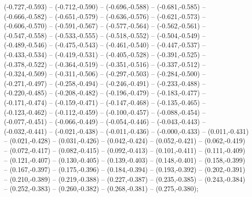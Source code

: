 (-0.727,-0.593) -- (-0.712,-0.590) -- (-0.696,-0.588) -- (-0.681,-0.585) -- (-0.666,-0.582) -- (-0.651,-0.579) -- (-0.636,-0.576) -- (-0.621,-0.573) -- (-0.606,-0.570) -- (-0.591,-0.567) -- (-0.577,-0.564) -- (-0.562,-0.561) -- (-0.547,-0.558) -- (-0.533,-0.555) -- (-0.518,-0.552) -- (-0.504,-0.549) -- (-0.489,-0.546) -- (-0.475,-0.543) -- (-0.461,-0.540) -- (-0.447,-0.537) -- (-0.433,-0.534) -- (-0.419,-0.531) -- (-0.405,-0.528) -- (-0.391,-0.525) -- (-0.378,-0.522) -- (-0.364,-0.519) -- (-0.351,-0.516) -- (-0.337,-0.512) -- (-0.324,-0.509) -- (-0.311,-0.506) -- (-0.297,-0.503) -- (-0.284,-0.500) -- (-0.271,-0.497) -- (-0.258,-0.494) -- (-0.246,-0.491) -- (-0.233,-0.488) -- (-0.220,-0.485) -- (-0.208,-0.482) -- (-0.196,-0.479) -- (-0.183,-0.477) -- (-0.171,-0.474) -- (-0.159,-0.471) -- (-0.147,-0.468) -- (-0.135,-0.465) -- (-0.123,-0.462) -- (-0.112,-0.459) -- (-0.100,-0.457) -- (-0.088,-0.454) -- (-0.077,-0.451) -- (-0.066,-0.449) -- (-0.054,-0.446) -- (-0.043,-0.443) -- (-0.032,-0.441) -- (-0.021,-0.438) -- (-0.011,-0.436) -- (-0.000,-0.433) -- (0.011,-0.431) -- (0.021,-0.428) -- (0.031,-0.426) -- (0.042,-0.424) -- (0.052,-0.421) -- (0.062,-0.419) -- (0.072,-0.417) -- (0.082,-0.415) -- (0.092,-0.413) -- (0.101,-0.411) -- (0.111,-0.409) -- (0.121,-0.407) -- (0.130,-0.405) -- (0.139,-0.403) -- (0.148,-0.401) -- (0.158,-0.399) -- (0.167,-0.397) -- (0.175,-0.396) -- (0.184,-0.394) -- (0.193,-0.392) -- (0.202,-0.391) -- (0.210,-0.389) -- (0.219,-0.388) -- (0.227,-0.387) -- (0.235,-0.385) -- (0.243,-0.384) -- (0.252,-0.383) -- (0.260,-0.382) -- (0.268,-0.381) -- (0.275,-0.380);
